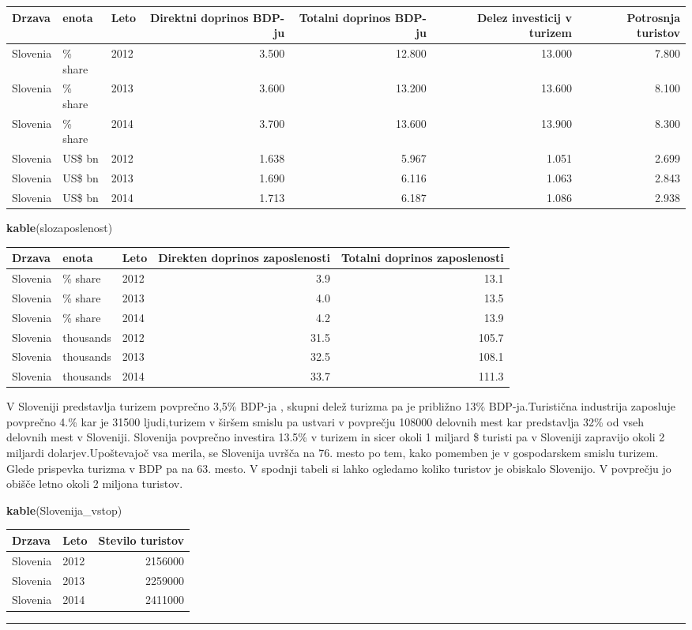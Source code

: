 \documentclass[]{article}
\newenvironment{Shaded}{\begin{snugshade}}{\end{snugshade}}
\newcommand{\KeywordTok}[1]{\textcolor[rgb]{0.13,0.29,0.53}{\textbf{{#1}}}}
\newcommand{\NormalTok}[1]{{#1}}
\begin{document}
\begin{longtable}[c]{@{}lllrrrr@{}}
\toprule
Drzava & enota & Leto & Direktni doprinos BDP-ju & Totalni doprinos
BDP-ju & Delez investicij v turizem & Potrosnja turistov\tabularnewline
\midrule
\endhead
Slovenia & \% share & 2012 & 3.500 & 12.800 & 13.000 &
7.800\tabularnewline
Slovenia & \% share & 2013 & 3.600 & 13.200 & 13.600 &
8.100\tabularnewline
Slovenia & \% share & 2014 & 3.700 & 13.600 & 13.900 &
8.300\tabularnewline
Slovenia & US\$ bn & 2012 & 1.638 & 5.967 & 1.051 & 2.699\tabularnewline
Slovenia & US\$ bn & 2013 & 1.690 & 6.116 & 1.063 & 2.843\tabularnewline
Slovenia & US\$ bn & 2014 & 1.713 & 6.187 & 1.086 & 2.938\tabularnewline
\bottomrule
\end{longtable}

\begin{Shaded}
\begin{Highlighting}[]
\KeywordTok{kable}\NormalTok{(slozaposlenost)}
\end{Highlighting}
\end{Shaded}

\begin{longtable}[c]{@{}lllrr@{}}
\toprule
Drzava & enota & Leto & Direkten doprinos zaposlenosti & Totalni
doprinos zaposlenosti\tabularnewline
\midrule
\endhead
Slovenia & \% share & 2012 & 3.9 & 13.1\tabularnewline
Slovenia & \% share & 2013 & 4.0 & 13.5\tabularnewline
Slovenia & \% share & 2014 & 4.2 & 13.9\tabularnewline
Slovenia & thousands & 2012 & 31.5 & 105.7\tabularnewline
Slovenia & thousands & 2013 & 32.5 & 108.1\tabularnewline
Slovenia & thousands & 2014 & 33.7 & 111.3\tabularnewline
\bottomrule
\end{longtable}

V Sloveniji predstavlja turizem povprečno 3,5\% BDP-ja , skupni delež
turizma pa je približno 13\% BDP-ja.Turistična industrija zaposluje
povprečno 4.\% kar je 31500 ljudi,turizem v širšem smislu pa ustvari v
povprečju 108000 delovnih mest kar predstavlja 32\% od vseh delovnih
mest v Sloveniji. Slovenija povprečno investira 13.5\% v turizem in
sicer okoli 1 miljard \$ turisti pa v Sloveniji zapravijo okoli 2
miljardi dolarjev.Upoštevajoč vsa merila, se Slovenija uvršča na 76.
mesto po tem, kako pomemben je v gospodarskem smislu turizem. Glede
prispevka turizma v BDP pa na 63. mesto. V spodnji tabeli si lahko
ogledamo koliko turistov je obiskalo Slovenijo. V povprečju jo obišče
letno okoli 2 miljona turistov.

\begin{Shaded}
\begin{Highlighting}[]
\KeywordTok{kable}\NormalTok{(Slovenija_vstop)}
\end{Highlighting}
\end{Shaded}

\begin{longtable}[c]{@{}llr@{}}
\toprule
Drzava & Leto & Stevilo turistov\tabularnewline
\midrule
\endhead
Slovenia & 2012 & 2156000\tabularnewline
Slovenia & 2013 & 2259000\tabularnewline
Slovenia & 2014 & 2411000\tabularnewline
\bottomrule
\end{longtable}

\begin{center}\rule{0.5\linewidth}{\linethickness}\end{center}
\end{document}
